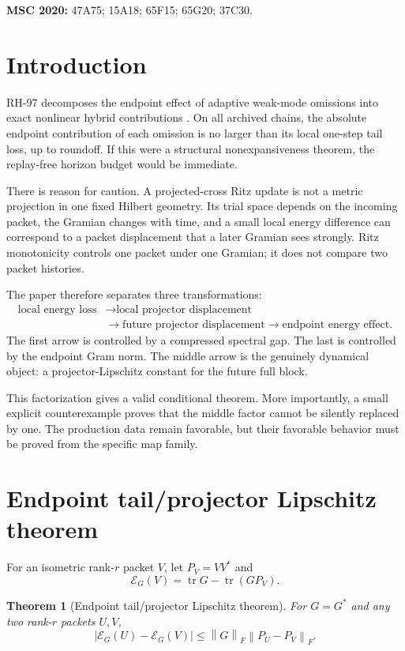\documentclass[11pt]{article}
\newtheorem{theorem}{Theorem}[section]
\theoremstyle{definition}
\theoremstyle{remark}
\newcommand{\norm}[1]{\left\lVert#1\right\rVert}
\newcommand{\tr}{\operatorname{tr}}
\newcommand{\E}{\mathcal E}
\begin{document}
\medskip
\noindent\textbf{MSC 2020:} 47A75; 15A18; 65F15; 65G20; 37C30.

\section{Introduction}

RH-97 decomposes the endpoint effect of adaptive weak-mode omissions into
exact nonlinear hybrid contributions \citep{WangHybrid2026}.  On all archived
chains, the absolute endpoint contribution of each omission is no larger than
its local one-step tail loss, up to roundoff.  If this were a structural
nonexpansiveness theorem, the replay-free horizon budget would be immediate.

There is reason for caution.  A projected-cross Ritz update is not a metric
projection in one fixed Hilbert geometry.  Its trial space depends on the
incoming packet, the Gramian changes with time, and a small local energy
difference can correspond to a packet displacement that a later Gramian sees
strongly.  Ritz monotonicity controls one packet under one Gramian; it does not
compare two packet histories.

The paper therefore separates three transformations:
\[
\begin{aligned}
 \text{local energy loss}
 &\longrightarrow \text{local projector displacement}\\
 &\longrightarrow \text{future projector displacement}
 \longrightarrow \text{endpoint energy effect}.
\end{aligned}
\]
The first arrow is controlled by a compressed spectral gap.  The last is
controlled by the endpoint Gram norm.  The middle arrow is the genuinely
dynamical object: a projector-Lipschitz constant for the future full block.

This factorization gives a valid conditional theorem.  More importantly, a
small explicit counterexample proves that the middle factor cannot be
silently replaced by one.  The production data remain favorable, but their
favorable behavior must be proved from the specific map family.

\section{Endpoint tail/projector Lipschitz theorem}
\label{sec:endpoint}

For an isometric rank-$r$ packet $V$, let $P_V=VV^*$ and
\[
 \E_G(V)=\tr G-\tr(GP_V).
\]

\begin{theorem}[Endpoint tail/projector Lipschitz theorem]
\label{thm:endpoint}
For $G=G^*$ and any two rank-$r$ packets $U,V$,
\begin{equation}
 |\E_G(U)-\E_G(V)|
 \le\norm G_F\norm{P_U-P_V}_F.
 \label{eq:endpoint}
\end{equation}
\end{theorem}
\end{document}
